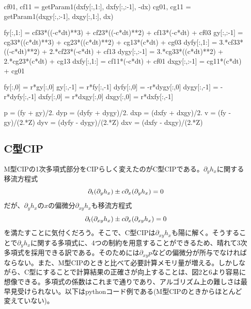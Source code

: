 \documentclass[dvipdfmx, 9pt, a4paper]{jsarticle}
\begin{document}
\begin{python}
	cf01, cf11 = getParam1(dxfy[:,1:], dxfy[:,:-1], -dx)
	cg01, cg11 = getParam1(dxgy[:,:-1], dxgy[:,1:], dx)

	fy[:,1:] = cf33*((-c*dt)**3) + cf23*((-c*dt)**2) + cf13*(-c*dt) + cf03
	gy[:,:-1] = cg33*((c*dt)**3) + cg23*((c*dt)**2) + cg13*(c*dt) + cg03
	dyfy[:,1:] = 3.*cf33*((-c*dt)**2) + 2.*cf23*(-c*dt) + cf13
	dygy[:,:-1] = 3.*cg33*((c*dt)**2) + 2.*cg23*(c*dt) + cg13
	dxfy[:,1:] = cf11*(-c*dt) + cf01
	dxgy[:,:-1] = cg11*(c*dt) + cg01

	fy[:,0] = r*gy[:,0]
	gy[:,-1] = r*fy[:,-1]
	dyfy[:,0] = -r*dygy[:,0]
	dygy[:,-1] = -r*dyfy[:,-1]
	dxfy[:,0] = r*dxgy[:,0]
	dxgy[:,0] = r*dxfy[:,-1]

	p = (fy + gy)/2.
	dyp = (dyfy + dygy)/2.
	dxp = (dxfy + dxgy)/2.
	v = (fy - gy)/(2.*Z)
	dyv = (dyfy - dygy)/(2.*Z)
	dxv = (dxfy - dxgy)/(2.*Z)
\end{python}

\subsection{C型CIP}
M型CIPの1次多項式部分をCIPらしく変えたのがC型CIPである。$\partial_yh_x$に関する移流方程式
\begin{equation}
\partial_t(\partial_yh_x)\pm c\partial_x(\partial_yh_x)=0\notag
\end{equation}
だが、$\partial_yh_x$の$x$の偏微分$\partial_{xy}h_x$も移流方程式
\begin{equation}
\partial_t(\partial_{xy}h_x)\pm c\partial_x(\partial_{xy}h_x)=0\notag
\end{equation}
を満たすことに気付くだろう。そこで、C型CIPは$\partial_{xy}h_x$も陽に解く。そうすることで$\partial_yh_x$に関する多項式に、4つの制約を用意することができるため、晴れて3次多項式を採用できる訳である。そのためには$\partial_{xy}p$などの偏微分が所与でなければならない。また、M型CIPのときと比べて必要計算メモリ量が増える。しかしながら、C型にすることで計算結果の正確さが向上することは、図2と6より容易に想像できる。多項式の係数はこれまで通りであり、アルゴリズム上の難しさは最早見受けられない。以下はpythonコード例である(M型CIPのときからほとんど変えていない)。
\end{document}
